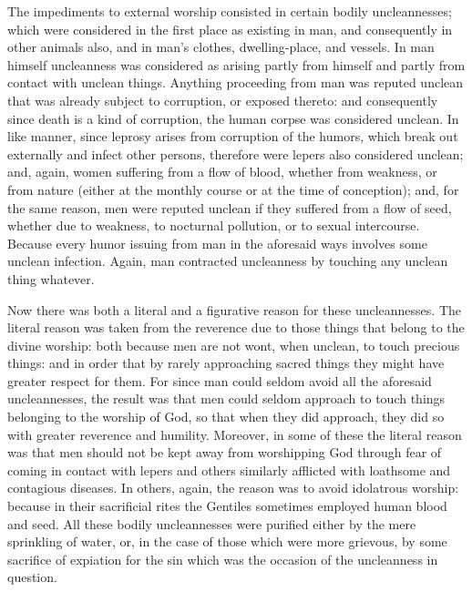 The impediments to external worship consisted in certain bodily uncleannesses; which were considered in the first place as existing in man, and consequently in other animals also, and in man's clothes, dwelling-place, and vessels. In man himself uncleanness was considered as arising partly from himself and partly from contact with unclean things. Anything proceeding from man was reputed unclean that was already subject to corruption, or exposed thereto: and consequently since death is a kind of corruption, the human corpse was considered unclean. In like manner, since leprosy arises from corruption of the humors, which break out externally and infect other persons, therefore were lepers also considered unclean; and, again, women suffering from a flow of blood, whether from weakness, or from nature (either at the monthly course or at the time of conception); and, for the same reason, men were reputed unclean if they suffered from a flow of seed, whether due to weakness, to nocturnal pollution, or to sexual intercourse. Because every humor issuing from man in the aforesaid ways involves some unclean infection. Again, man contracted uncleanness by touching any unclean thing whatever.

Now there was both a literal and a figurative reason for these uncleannesses. The literal reason was taken from the reverence due to those things that belong to the divine worship: both because men are not wont, when unclean, to touch precious things: and in order that by rarely approaching sacred things they might have greater respect for them. For since man could seldom avoid all the aforesaid uncleannesses, the result was that men could seldom approach to touch things belonging to the worship of God, so that when they did approach, they did so with greater reverence and humility. Moreover, in some of these the literal reason was that men should not be kept away from worshipping God through fear of coming in contact with lepers and others similarly afflicted with loathsome and contagious diseases. In others, again, the reason was to avoid idolatrous worship: because in their sacrificial rites the Gentiles sometimes employed human blood and seed. All these bodily uncleannesses were purified either by the mere sprinkling of water, or, in the case of those which were more grievous, by some sacrifice of expiation for the sin which was the occasion of the uncleanness in question.

